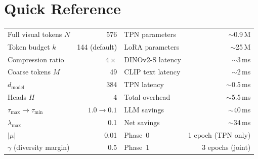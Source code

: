 \documentclass[11pt,a4paper]{article}
\begin{document}
\section{Quick Reference}
\label{sec:reference}

\begin{keybox}[title={Key Numbers at a Glance}]
\renewcommand{\arraystretch}{1.15}
\small
\begin{tabular}{@{}lr||lr@{}}
  Full visual tokens $N$ & 576 &
    TPN parameters & $\sim$0.9\,M \\
  Token budget $k$ & 144 (default) &
    LoRA parameters & $\sim$25\,M \\
  Compression ratio & $4\times$ &
    DINOv2-S latency & $\sim$3\,ms \\
  Coarse tokens $M$ & 49 &
    CLIP text latency & $\sim$2\,ms \\
  $d_{\text{model}}$ & 384 &
    TPN latency & $\sim$0.5\,ms \\
  Heads $H$ & 4 &
    Total overhead & $\sim$5.5\,ms \\
  $\tau_{\max} \to \tau_{\min}$ & $1.0 \to 0.1$ &
    LLM savings & $\sim$40\,ms \\
  $\lambda_{\max}$ & 0.1 &
    Net savings & $\sim$34\,ms \\
  $|\mu|$ & 0.01 &
    Phase~0 & 1 epoch (TPN only) \\
  $\gamma$ (diversity margin) & 0.5 &
    Phase~1 & 3 epochs (joint) \\
\end{tabular}
\end{keybox}

\end{document}
